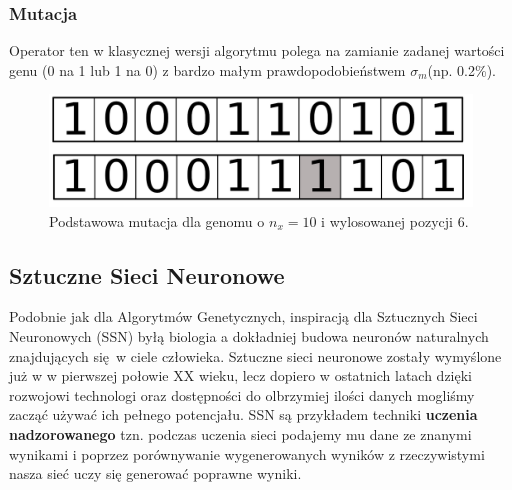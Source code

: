 \documentclass{article}
\begin{document}
\subsubsection{Mutacja}
Operator ten w klasycznej wersji algorytmu polega na zamianie zadanej wartości genu
(0 na 1 lub 1 na 0) z bardzo małym  prawdopodobieństwem $\sigma_m$(np. 0.2\%).
\begin{figure}[H]
\centering
\includegraphics[scale=0.2]{mutation_v2.png}
\caption{Podstawowa mutacja dla genomu o $n_x = 10$ i wylosowanej pozycji 6.}
\end{figure}



\subsection{Sztuczne Sieci Neuronowe}
Podobnie jak dla Algorytmów Genetycznych, inspiracją dla Sztucznych Sieci Neuronowych (SSN) 
byłą biologia a dokładniej budowa neuronów naturalnych znajdujących się w ciele człowieka.
Sztuczne sieci neuronowe zostały wymyślone już w w pierwszej połowie XX wieku, lecz dopiero w ostatnich latach
dzięki rozwojowi technologi oraz dostępności do olbrzymiej ilości danych mogliśmy zacząć używać
ich pełnego potencjału. SSN są przykładem techniki \textbf{uczenia nadzorowanego} tzn.
podczas uczenia sieci podajemy mu dane ze znanymi wynikami i poprzez porównywanie wygenerowanych
wyników z rzeczywistymi nasza sieć uczy się generować poprawne wyniki.
\end{document}
